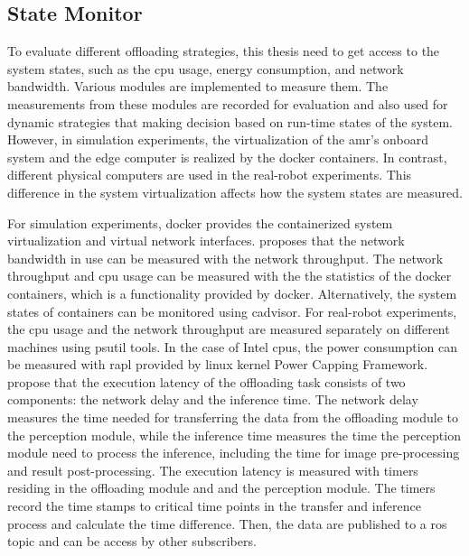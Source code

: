 \subsection{State Monitor}

To evaluate different offloading strategies, this thesis need to get access to the system states, such as the \gls{cpu} usage, energy consumption, and network bandwidth. Various modules are implemented to measure them. 
The measurements from these modules are recorded for evaluation and also used for dynamic strategies that making decision based on run-time states of the system. However, in simulation experiments, the virtualization of the \gls{amr}'s onboard system and the edge computer is realized by the \gls{docker} containers. In contrast, different physical computers are used in the real-robot experiments. This difference in the system virtualization affects how the system states are measured. 

For simulation experiments, \gls{docker} provides the containerized system virtualization and virtual network interfaces. \citeauthor*{Ruggeri2022} \cite{Ruggeri2022} proposes that the network bandwidth in use can be measured with the network throughput. The network throughput and \gls{cpu} usage can be measured with the the statistics of the \gls{docker} containers, which is a functionality provided by \gls{docker}. Alternatively, the system states of containers can be monitored using \gls{cadvisor}. For real-robot experiments, the \gls{cpu} usage and the network throughput are measured separately on different machines using \gls{psutil} tools. In the case of Intel \glspl{cpu}, the power consumption can be measured with \gls{rapl} provided by \gls{linux} kernel Power Capping Framework. \citeauthor*{Xie2021} \cite{Xie2021} propose that the execution latency of the offloading task consists of two components: the network delay and the inference time. The network delay measures the time needed for transferring the data from the offloading module to the perception module, while the inference time measures the time the perception module need to process the inference, including the time for image pre-processing and result post-processing. The execution latency is measured with timers residing in the offloading module and and the perception module. The timers record the time stamps to critical time points in the transfer and inference process and calculate the time difference. Then, the data are published to a \gls{ros} topic and can be access by other subscribers. 

